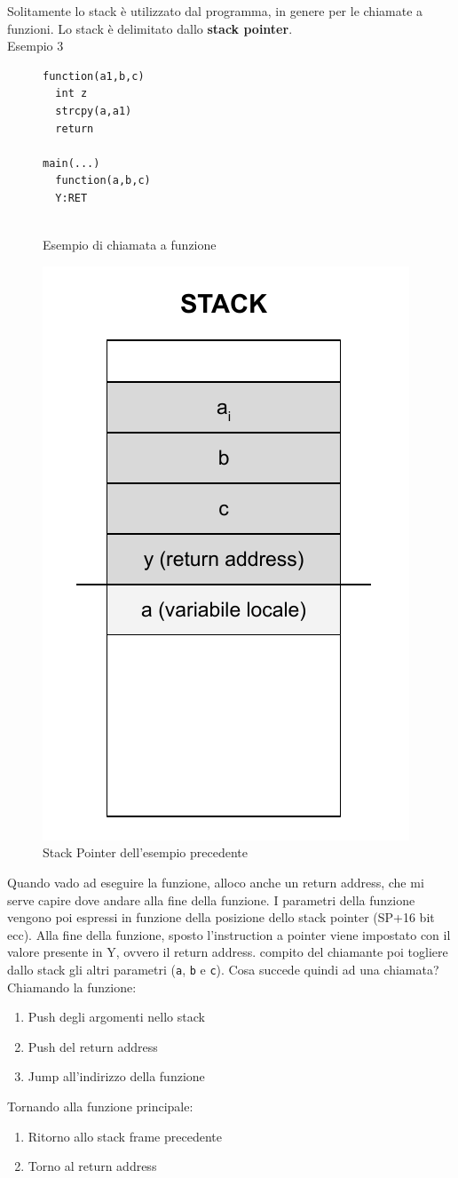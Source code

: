 \documentclass[a4paper,12pt]{article}
\begin{document}
Solitamente lo stack è utilizzato dal programma, in genere per le chiamate a funzioni. Lo stack è delimitato dallo \textbf{stack pointer}.
\\Esempio 3\\

\begin{figure}[H]
\centering
\begin{lstlisting}[xleftmargin=.35\textwidth]
function(a1,b,c)
  int z
  strcpy(a,a1)
  return
  
main(...)
  function(a,b,c)
  Y:RET	
	
\end{lstlisting}
\caption{Esempio di chiamata a funzione}
\end{figure}

\begin{figure}[H]
	\centering
	\includegraphics[width=0.4\linewidth]{Immagini/Stack3.pdf}
	\caption{Stack Pointer dell'esempio precedente}
\end{figure}

Quando vado ad eseguire la funzione, alloco anche un return address, che mi serve capire dove andare alla fine della funzione. I parametri della funzione vengono poi espressi in funzione della posizione dello stack pointer (SP+16 bit ecc). Alla fine della funzione, sposto l'instruction a pointer viene impostato con il valore presente in Y, ovvero il return address. \E compito del chiamante poi togliere dallo stack gli altri parametri (\texttt{a}, \texttt{b} e \texttt{c}).
Cosa succede quindi ad una chiamata?\\
Chiamando la funzione:
\begin{enumerate}
\item Push degli argomenti nello stack
\item Push del return address
\item Jump all'indirizzo della funzione
\end{enumerate}
Tornando alla funzione principale:
\begin{enumerate}
\item Ritorno allo stack frame precedente
\item Torno al return address
\end{enumerate}
\end{document}

